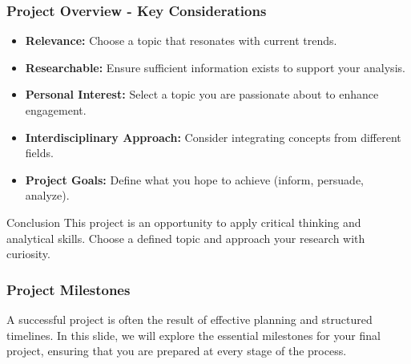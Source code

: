 \documentclass[aspectratio=169]{beamer}
\begin{document}
\begin{frame}[fragile]
    \frametitle{Project Overview - Key Considerations}
    \begin{itemize}
        \item \textbf{Relevance:} Choose a topic that resonates with current trends.
        \item \textbf{Researchable:} Ensure sufficient information exists to support your analysis.
        \item \textbf{Personal Interest:} Select a topic you are passionate about to enhance engagement.
        \item \textbf{Interdisciplinary Approach:} Consider integrating concepts from different fields.
        \item \textbf{Project Goals:} Define what you hope to achieve (inform, persuade, analyze).
    \end{itemize}
    
    \begin{block}{Conclusion}
        This project is an opportunity to apply critical thinking and analytical skills. Choose a defined topic and approach your research with curiosity.
    \end{block}
\end{frame}

\begin{frame}[fragile]
    \frametitle{Project Milestones}
    A successful project is often the result of effective planning and structured timelines. In this slide, we will explore the essential milestones for your final project, ensuring that you are prepared at every stage of the process.
\end{frame}
\end{document}
